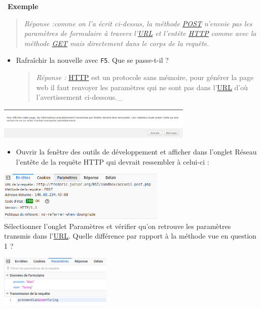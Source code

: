 \documentclass[
  11pt,
]{article}
\newcommand{\passthrough}[1]{#1}
\providecommand{\tightlist}{%
  \setlength{\itemsep}{0pt}\setlength{\parskip}{0pt}}
\newcounter{exple}
\newenvironment{exemple}[1]
{\par \medskip   \addtocounter{exple}{1} \noindent  
\begin{bclogo}[arrondi =0.1,   noborder = true, logo=\bclampe, marge=4]{~\textbf{Exemple} \textbf{\theexple} {\itshape #1} }  \par}
{
\end{bclogo}
 \par \bigskip }
\begin{document}
\begin{exemple}{}
\begin{enumerate}
  \begin{quote}
  \emph{Réponse :comme on l'a écrit ci-dessus, la méthode \url{POST}
  n'envoie pas les paramètres de formulaire à travers l'\url{URL} et
  l'entête \url{HTTP} comme avec la méthode \url{GET} mais directement
  dans le corps de la requête}.
  \end{quote}

  \begin{itemize}
  \item
    Rafraîchir la nouvelle avec \passthrough{\lstinline!F5!}. Que se
    passe-t-il ?

    \begin{quote}
    \emph{Réponse : }\url{HTTP} est un protocole sans mémoire, pour
    générer la page web il faut renvoyer les paramètres qui ne sont pas
    dans l'\url{URL} d'où l'avertissement ci-dessous.\_
    \end{quote}
  \end{itemize}

  \includegraphics[width=0.7\textwidth,height=\textheight]{images/avertissement-post.png}\\

  \begin{itemize}
  \tightlist
  \item
    Ouvrir la fenêtre des outils de développement et afficher dans
    l'onglet Réseau l'entête de la requête HTTP qui devrait ressembler à
    celui-ci :
  \end{itemize}

  \includegraphics[width=0.6\textwidth,height=\textheight]{images/entete-post.png}\\

  Sélectionner l'onglet Paramètres et vérifier qu'on retrouve les
  paramètres transmis dans
  l'\href{https://developer.mozilla.org/fr/docs/Glossaire/URL}{URL}.
  Quelle différence par rapport à la méthode vue en question 1 ?

  \includegraphics[width=0.4\textwidth,height=\textheight]{images/parametres2.png}\\


\end{enumerate}
\end{exemple}
\end{document}
